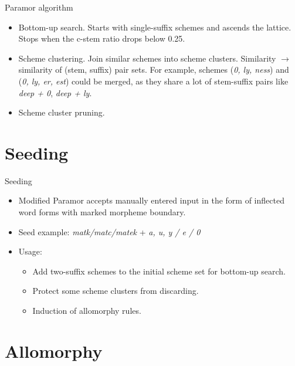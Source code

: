 \documentclass[hyperref={pdfencoding=unicode, unicode=true}, xcolor=dvipsnames]{beamer}
\begin{document}
\begin{frame}{Paramor algorithm}
\begin{itemize}
\item Bottom-up search. Starts with single-suffix schemes and ascends the lattice. Stops when the c-stem ratio drops below 0.25.
\item Scheme clustering. Join similar schemes into scheme clusters. Similarity $\rightarrow$ similarity of (stem, suffix) pair sets. For example, schemes (\emph{0, ly, ness}) and (\emph{0, ly, er, est}) could be merged, as they share a lot of stem-suffix pairs like \emph{deep + 0}, \emph{deep + ly}.
\item Scheme cluster pruning.
\end{itemize}
\end{frame}

\section{Seeding}

\begin{frame}{Seeding}
\begin{itemize}
\item Modified Paramor accepts manually entered input in the form of inflected word forms with marked morpheme boundary.
\item Seed example: \emph{matk/matc/matek} + \emph{a, u, y / e / 0}
\item Usage: \begin{itemize}
    \item Add two-suffix schemes to the initial scheme set for bottom-up search.
    \item Protect some scheme clusters from discarding.
    \item Induction of allomorphy rules.
\end{itemize}
\end{itemize}
\end{frame}

\section{Allomorphy}
\end{document}
